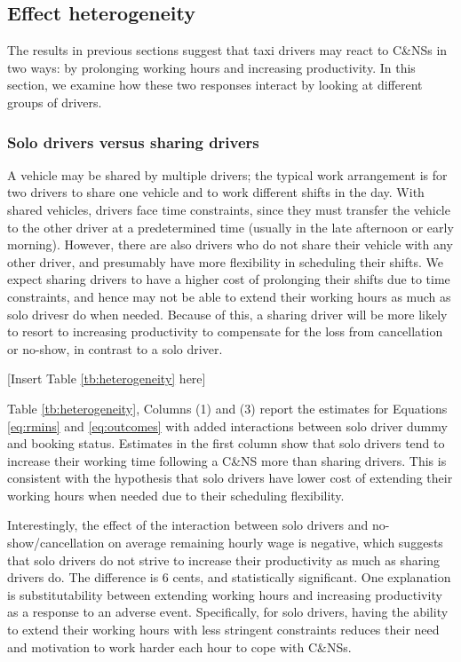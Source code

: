 \documentclass[reviewmode]{restud}
\begin{document}
\subsection{Effect heterogeneity}

The results in previous sections suggest that taxi drivers may react to C\&NSs in two ways: by prolonging working hours and increasing productivity. In this section, we examine how these two responses interact by looking at different groups of drivers.

\subsubsection{Solo drivers versus sharing drivers}

A vehicle may be shared by multiple drivers; the typical work arrangement is for two drivers to share one vehicle and to work different shifts in the day. With shared vehicles, drivers face time constraints, since they must transfer the vehicle to the other driver at a predetermined time (usually in the late afternoon or early morning). However, there are also drivers who do not share their vehicle with any other driver, and presumably have more flexibility in scheduling their shifts.
We expect sharing drivers to have a higher cost of prolonging their shifts due to time constraints, and hence may not be able to extend their working hours as much as solo drivesr do when needed. Because of this, a sharing driver will be more likely to resort to increasing productivity to compensate for the loss from cancellation or no-show, in contrast to a solo driver.

\begin{center}
	[Insert Table \ref{tb:heterogeneity} here]
\end{center}

Table \ref{tb:heterogeneity}, Columns (1) and (3) report the estimates for Equations \eqref{eq:rmins} and \eqref{eq:outcomes} with added interactions between solo driver dummy and booking status. Estimates in the first column show that solo drivers tend to increase their working time following a C\&NS more than sharing drivers. This is consistent with the hypothesis that solo drivers have lower cost of extending their working hours when needed due to their scheduling flexibility.

Interestingly, the effect of the interaction between solo drivers and no-show/cancellation on average remaining hourly wage is negative, which suggests that solo drivers do not strive to increase their productivity as much as sharing drivers do. The difference is 6 cents, and statistically significant. One explanation is substitutability between extending working hours and increasing productivity as a response to an adverse event. Specifically, for solo drivers, having the ability to extend their working hours with less stringent constraints reduces their need and motivation to work harder each hour to cope with C\&NSs.
\end{document}
